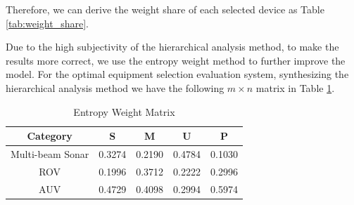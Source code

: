 \documentclass[12pt]{article}
\begin{document}
Therefore, we can derive the weight share of each selected device as Table \ref{tab:weight_share}.

Due to the high subjectivity of the hierarchical analysis method, to make the results more correct, we use the entropy weight method to further improve the model. For the optimal equipment selection evaluation system, synthesizing the hierarchical analysis method we have the following $m \times n$ matrix in Table \ref{tab:entropy_weight_matrix}.

\begin{table}[h!]
    \centering
    \caption{Entropy Weight Matrix}
    \label{tab:entropy_weight_matrix}
    \vspace{.4cm}
    \begin{tabular}{ccccc}
        \toprule
        Category         & S      & M      & U      & P      \\
        \midrule
        Multi-beam Sonar & 0.3274 & 0.2190 & 0.4784 & 0.1030 \\
        ROV              & 0.1996 & 0.3712 & 0.2222 & 0.2996 \\
        AUV              & 0.4729 & 0.4098 & 0.2994 & 0.5974 \\
        \bottomrule
    \end{tabular}
\end{table}






\end{document}
